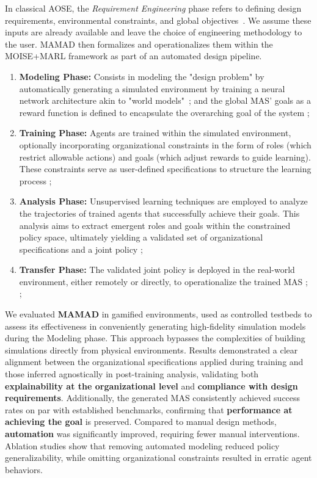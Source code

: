 \documentclass[pdflatex,sn-mathphys-num]{sn-jnl}%
\theoremstyle{thmstyleone}%
\theoremstyle{thmstyletwo}%
\theoremstyle{thmstylethree}%
\begin{document}
In classical AOSE, the \textit{Requirement Engineering} phase refers to defining design requirements, environmental constraints, and global objectives~\cite{Pavon2003, Bernon2005}. We assume these inputs are already available and leave the choice of engineering methodology to the user. MAMAD then formalizes and operationalizes them within the MOISE+MARL framework as part of an automated design pipeline.

\begin{enumerate}
  \item \textbf{Modeling Phase:} Consists in modeling the "design problem" by automatically generating a simulated environment by training a neural network architecture akin to "world models"~\cite{Ha2018}; and the global MAS' goals as a reward function is defined to encapsulate the overarching goal of the system ;
  \item \textbf{Training Phase:} Agents are trained within the simulated environment, optionally incorporating organizational constraints in the form of roles (which restrict allowable actions) and goals (which adjust rewards to guide learning). These constraints serve as user-defined specifications to structure the learning process ;
  \item \textbf{Analysis Phase:} Unsupervised learning techniques are employed to analyze the trajectories of trained agents that successfully achieve their goals. This analysis aims to extract emergent roles and goals within the constrained policy space, ultimately yielding a validated set of organizational specifications and a joint policy ;
  \item \textbf{Transfer Phase:} The validated joint policy is deployed in the real-world environment, either remotely or directly, to operationalize the trained MAS ; ;
\end{enumerate}
We evaluated \textbf{MAMAD} in gamified environments, used as controlled testbeds to assess its effectiveness in conveniently generating high-fidelity simulation models during the Modeling phase. This approach bypasses the complexities of building simulations directly from physical environments.
Results demonstrated a clear alignment between the organizational specifications applied during training and those inferred agnostically in post-training analysis, validating both \textbf{explainability at the organizational level} and \textbf{compliance with design requirements}. Additionally, the generated MAS consistently achieved success rates on par with established benchmarks, confirming that \textbf{performance at achieving the goal} is preserved. Compared to manual design methods, \textbf{automation} was significantly improved, requiring fewer manual interventions. Ablation studies show that removing automated modeling reduced policy generalizability, while omitting organizational constraints resulted in erratic agent behaviors.
\end{document}
